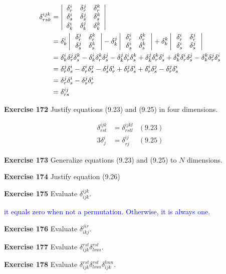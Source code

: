 \documentclass[12pt,a4paper]{report}
\newcommand{\BLUE}[1]{\textcolor{blue}{#1}}
\begin{document}
\begin{description}
\BLUE{\begin{align*}
	\delta_{rsk}^{ijk} &= \left |\begin{array}{ccc}
		\delta_r^i & \delta_r^j & \delta_r^k \\
		\delta_s^i & \delta_s^j & \delta_s^k \\
		\delta_k^i & \delta_k^j & \delta_k^k \\
	\end{array} \right | \\
	&= \delta_k^i \left |\,  \begin{array}{c c} \delta_r^j&\delta_r^k \\ \delta_s^j & \delta_s^k \end{array}  \,\right | - \delta_k^j\left |\,  \begin{array}{c c} \delta_r^i&\delta_r^k \\ \delta_s^i & \delta_s^k \end{array}  \,\right | + \delta_k^k\left |\,  \begin{array}{c c} \delta_r^i&\delta_r^j \\ \delta_s^i & \delta_s^j \end{array}  \,\right | \\
	&= \delta_k^i\delta_r^j\delta_s^k-\delta_k^i\delta_r^k\delta_s^j - \delta_k^j\delta_r^i\delta_s^k+\delta_k^j\delta_r^k\delta_s^i+\delta_k^k\delta_r^i\delta_s^j-\delta_k^k\delta_r^j\delta_s^i \\
	&= \delta_r^j\delta_s^i-\delta_r^i\delta_s^j-\delta_s^j\delta_r^i+\delta_r^j\delta_s^i+\delta_r^i\delta_s^j-\delta_r^j\delta_s^i \\
	&= \delta_r^j\delta_s^i-\delta_s^j\delta_r^i \\
	&= \delta_{rs}^{ij}
\end{align*}
}

\item \textbf{Exercise 172} Justify equations (9.23) and (9.25) in four dimensions.

\begin{align*}
	\delta_{rst}^{ijk} &= \delta_{rstl}^{ijkl} & (9.23)\\
	3\delta_j^i &= \delta_{rj}^{ij} & (9.25)
\end{align*}

\item \textbf{Exercise 173} Generalize equations (9.23) and (9.25) to $N$ dimensions.
\item \textbf{Exercise 174} Justify equation (9.26)
\item \textbf{Exercise 175} Evaluate $\delta_{ijk}^{ijk}$.

\BLUE{it equals zero when not a permutation.  Otherwise, it is always one.
}

\item \textbf{Exercise 176} Evaluate $\delta_{ikj}^{jir}$.
\item \textbf{Exercise 177} Evaluate $\delta_{ijk}^{rst}\delta_{lmn}^{rst}$.
\item \textbf{Exercise 178} Evaluate $\delta_{ijk}^{rst}\delta_{lmn}^{rst}\delta_{ijk}^{lmn}$.


\end{description}
\end{document}
